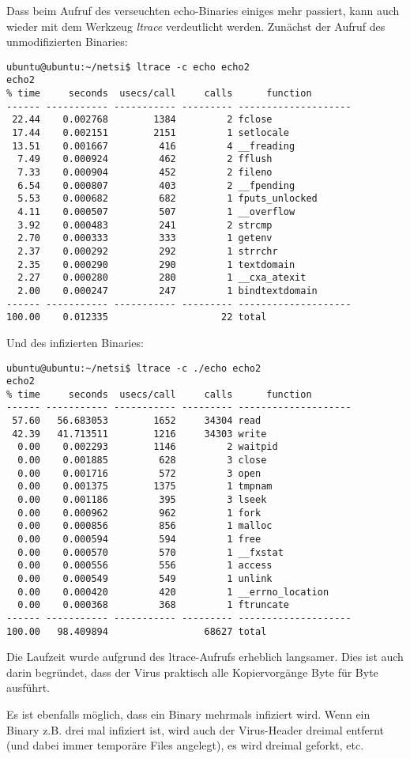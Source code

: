 \documentclass[a4paper,11pt,parskip=half]{scrartcl}
\begin{document}
Dass beim Aufruf des verseuchten echo-Binaries einiges mehr passiert, kann auch wieder mit dem Werkzeug \emph{ltrace} verdeutlicht werden. Zunächst der Aufruf des unmodifizierten Binaries:
\begin{lstlisting}
ubuntu@ubuntu:~/netsi$ ltrace -c echo echo2
echo2
% time     seconds  usecs/call     calls      function
------ ----------- ----------- --------- --------------------
 22.44    0.002768        1384         2 fclose
 17.44    0.002151        2151         1 setlocale
 13.51    0.001667         416         4 __freading
  7.49    0.000924         462         2 fflush
  7.33    0.000904         452         2 fileno
  6.54    0.000807         403         2 __fpending
  5.53    0.000682         682         1 fputs_unlocked
  4.11    0.000507         507         1 __overflow
  3.92    0.000483         241         2 strcmp
  2.70    0.000333         333         1 getenv
  2.37    0.000292         292         1 strrchr
  2.35    0.000290         290         1 textdomain
  2.27    0.000280         280         1 __cxa_atexit
  2.00    0.000247         247         1 bindtextdomain
------ ----------- ----------- --------- --------------------
100.00    0.012335                    22 total
\end{lstlisting}

Und des infizierten Binaries:
\begin{lstlisting}
ubuntu@ubuntu:~/netsi$ ltrace -c ./echo echo2
echo2
% time     seconds  usecs/call     calls      function
------ ----------- ----------- --------- --------------------
 57.60   56.683053        1652     34304 read
 42.39   41.713511        1216     34303 write
  0.00    0.002293        1146         2 waitpid
  0.00    0.001885         628         3 close
  0.00    0.001716         572         3 open
  0.00    0.001375        1375         1 tmpnam
  0.00    0.001186         395         3 lseek
  0.00    0.000962         962         1 fork
  0.00    0.000856         856         1 malloc
  0.00    0.000594         594         1 free
  0.00    0.000570         570         1 __fxstat
  0.00    0.000556         556         1 access
  0.00    0.000549         549         1 unlink
  0.00    0.000420         420         1 __errno_location
  0.00    0.000368         368         1 ftruncate
------ ----------- ----------- --------- --------------------
100.00   98.409894                 68627 total
\end{lstlisting}

Die Laufzeit wurde aufgrund des ltrace-Aufrufs erheblich langsamer. Dies ist auch darin begründet, dass der Virus praktisch alle Kopiervorgänge Byte für Byte ausführt.

Es ist ebenfalls möglich, dass ein Binary mehrmals infiziert wird. Wenn ein Binary z.B. drei mal infiziert ist, wird auch der \glqq{}Virus-Header\grqq{} dreimal entfernt (und dabei immer temporäre Files angelegt), es wird dreimal geforkt, etc.
\end{document}
